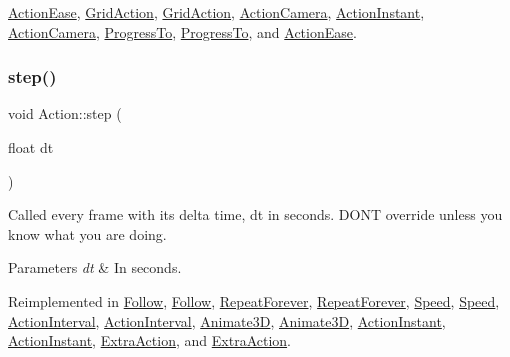 \hyperlink{classActionEase_a04976f42219b97e850043ab9cd182918}{Action\+Ease}, \hyperlink{classGridAction_a04dfa701007c415bb130766c99357334}{Grid\+Action}, \hyperlink{classGridAction_a33e2c1bc95bbcf6b16428097b4fd4b61}{Grid\+Action}, \hyperlink{classActionCamera_a8f0cefd9df0f40a71d868e753a8cc3bc}{Action\+Camera}, \hyperlink{classActionInstant_a47cff49ef73e126e5e9d6c26872a9e23}{Action\+Instant}, \hyperlink{classActionCamera_ab523607be45f90017decf4c5e493c733}{Action\+Camera}, \hyperlink{classProgressTo_ac32af7881cffffec6eb7dcfcb0a18c6b}{Progress\+To}, \hyperlink{classProgressTo_a9533f1dab48b9243b170f463b8498f07}{Progress\+To}, and \hyperlink{classActionEase_a2b1a6fe2d83fe96723ca32c30301fda5}{Action\+Ease}.

\mbox{\label{classAction_a9a64ee9e8e977672748f70893ebaff66}} 
\subsubsection{\texorpdfstring{step()}{step()}\hspace{0.1cm}{\footnotesize\ttfamily [1/2]}}
{\footnotesize\ttfamily void Action\+::step (\begin{DoxyParamCaption}\item[{float}]{dt }\end{DoxyParamCaption})\hspace{0.3cm}{\ttfamily [virtual]}}

Called every frame with it\textquotesingle{}s delta time, dt in seconds. D\+ON\textquotesingle{}T override unless you know what you are doing.


\begin{DoxyParams}{Parameters}
{\em dt} & In seconds. \\
\hline
\end{DoxyParams}


Reimplemented in \hyperlink{classFollow_a808fb0fab228b588de9642dc40bf9a14}{Follow}, \hyperlink{classFollow_a0f027ac080c352070a653d1dbb8f761d}{Follow}, \hyperlink{classRepeatForever_a102815f01bc0afc0fbcb31840cdb699b}{Repeat\+Forever}, \hyperlink{classRepeatForever_ab54150411685995a17a2b68d561e8d9c}{Repeat\+Forever}, \hyperlink{classSpeed_affaf70de829e3452df106ec55a238807}{Speed}, \hyperlink{classSpeed_a971cac28a44053f2011871529dac49a1}{Speed}, \hyperlink{classActionInterval_af31c89d43ca311f700b66f6b4fa1f362}{Action\+Interval}, \hyperlink{classActionInterval_a9a520f0c4bd2d5b92e7f355bccd6f5cf}{Action\+Interval}, \hyperlink{classAnimate3D_a9fed05e5478085f002769b6931a123d4}{Animate3D}, \hyperlink{classAnimate3D_a0bd0e3f67af5be334ef07255a711c476}{Animate3D}, \hyperlink{classActionInstant_ae1478ff1e34788247a0092dbd431c825}{Action\+Instant}, \hyperlink{classActionInstant_ab6c8b1bb612803681a2727a1d5d7b5df}{Action\+Instant}, \hyperlink{classExtraAction_adf523dd380d7c8e093c58473e2c84304}{Extra\+Action}, and \hyperlink{classExtraAction_a7e15c6b27f49d1057bf81bd0527f041b}{Extra\+Action}.

